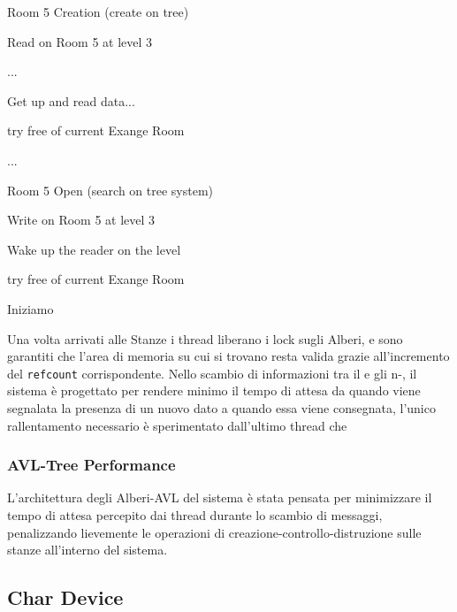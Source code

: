 \begin{itemize}[label=]
\begin{minipage}{0.45\linewidth}%
    \item Room  5 Creation (create on tree)
    \item Read on Room 5 at level 3
    \item ...
    \item Get up and read data...
    \item try free of current Exange Room
\end{minipage}%
\begin{minipage}{0.10\linewidth}%
\hfill%
\end{minipage}%
\begin{minipage}{0.45\linewidth}%
    \item ...
    \item Room  5 Open (search on tree system)
    \item Write on Room 5 at level 3
    \item Wake up the reader on the level
    \item try free of current Exange Room
\end{minipage}
\end{itemize}

Iniziamo

Una volta arrivati alle Stanze i thread liberano i lock sugli Alberi, e sono garantiti che l'area di memoria su cui si
trovano resta valida grazie all'incremento del \texttt{refcount} corrispondente.
Nello scambio di informazioni tra il \Writer e gli n-\Reader, il sistema è progettato per rendere minimo il tempo di
attesa da quando viene segnalata la presenza di un nuovo dato a quando essa viene consegnata, l'unico rallentamento
necessario è sperimentato dall'ultimo thread che



\subsubsection{AVL-Tree Performance} \label{treePerf}

L'architettura degli Alberi-AVL del sistema è stata pensata per minimizzare il tempo di attesa percepito dai thread
durante lo scambio di messaggi, penalizzando lievemente le operazioni di creazione-controllo-distruzione sulle stanze
all'interno del sistema.

\subsection{Char Device} \label{CharDevice}

